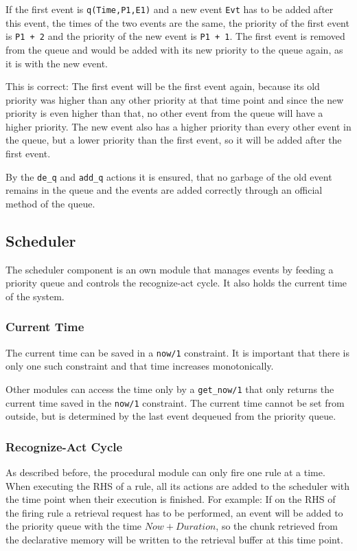 If the first event is \lstinline|q(Time,P1,E1)| and a new event \lstinline|Evt| has to be added after this event, the times of the two events are the same, the priority of the first event is \lstinline|P1 + 2| and the priority of the new event is \lstinline|P1 + 1|. The first event is removed from the queue and would be added with its new priority to the queue again, as it is with the new event. 

This is correct: The first event will be the first event again, because its old priority was higher than any other priority at that time point and since the new priority is even higher than that, no other event from the queue will have a higher priority. The new event also has a higher priority than every other event in the queue, but a lower priority than the first event, so it will be added after the first event.

By the \lstinline|de_q| and \lstinline|add_q| actions it is ensured, that no garbage of the old event remains in the queue and the events are added correctly through an official method of the queue.

\subsection{Scheduler}

The scheduler component is an own module that manages events by feeding a priority queue and controls the recognize-act cycle. It also holds the current time of the system. 

\subsubsection{Current Time}

The current time can be saved in a \lstinline|now/1| constraint. It is important that there is only one such constraint and that time increases monotonically.

Other modules can access the time only by a \lstinline|get_now/1| that only returns the current time saved in the \lstinline|now/1| constraint. The current time cannot be set from outside, but is determined by the last event dequeued from the priority queue.

\subsubsection{Recognize-Act Cycle}
\label{implementation:scheduler:recognize-act}

As described before, the procedural module can only fire one rule at a time. When executing the RHS of a rule, all its actions are added to the scheduler with the time point when their execution is finished. For example: If on the RHS of the firing rule a retrieval request has to be performed, an event will be added to the priority queue with the time $Now + Duration$, so the chunk retrieved from the declarative memory will be written to the retrieval buffer at this time point.

